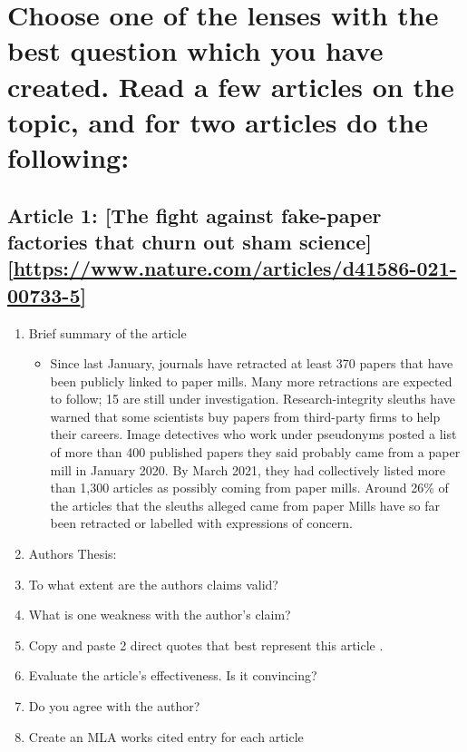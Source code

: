 \documentclass[11pt]{article}
\begin{document}
\section{Choose one of the lenses with the best question which you have created. Read a few articles on the topic, and for two articles do the following:}
\label{sec:orgf3c2284}
\subsection{Article 1: [The fight against fake-paper factories that churn out sham science][\url{https://www.nature.com/articles/d41586-021-00733-5}]}
\label{sec:org6688efc}
\begin{enumerate}
\item Brief summary of the article
\begin{itemize}
\item Since last January, journals have retracted at least 370 papers that have
been publicly linked to paper mills. Many more retractions are expected to
follow; 15 are still under investigation. Research-integrity sleuths have
warned that some scientists buy papers from third-party firms to help their
careers. Image detectives who work under pseudonyms posted a list of more
than 400 published papers they said probably came from a paper mill in
January 2020. By March 2021, they had collectively listed more than 1,300
articles as possibly coming from paper mills. Around 26\% of the articles
that the sleuths alleged came from paper Mills have so far been retracted
or labelled with expressions of concern.
\end{itemize}

\item Authors Thesis:
\item To what extent are the authors claims valid?
\item What is one weakness with the author's claim?
\item Copy and paste 2 direct quotes that best represent this article .
\item Evaluate the article's effectiveness. Is it convincing?
\item Do you agree with the author?
\item Create an MLA works cited entry for each article
\end{enumerate}
\end{document}
